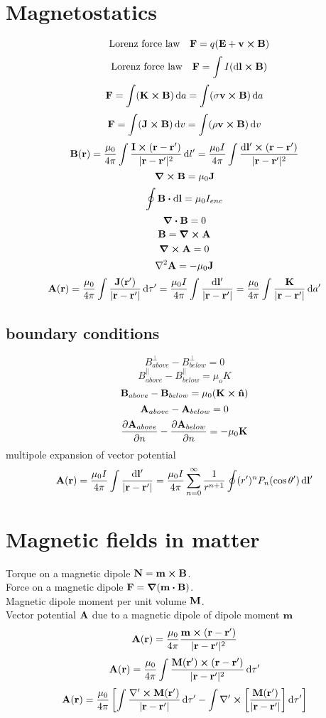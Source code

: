 \documentclass[12pt]{article}
\begin{document}
\section{Magnetostatics}
\[\qq{Lorenz force law}\vb{F}=q(\vb{E}+\vb{v}\cp\vb{B})\]
\[\qq{Lorenz force law}\vb{F}=\int I(\dd\vb{l}\cp\vb{B})\]
\[\vb{F}=\int (\vb{K}\cp\vb{B})\dd{a}=\int (\sigma\vb{v}\cp\vb{B})\dd{a}\]
\[\vb{F}=\int (\vb{J}\cp\vb{B})\dd{v}=\int (\rho\vb{v}\cp\vb{B})\dd{v}\]
\[\vb{B}(\vb{r})=\frac{\mu_0}{4\pi}\int\frac{\vb{I}\cp(\vb{r}-\vb{r}')}{|\vb{r}-\vb{r}'|^2}\dd{l'}=\frac{\mu_0I}{4\pi}\int\frac{\dd\vb{l'}\cp(\vb{r}-\vb{r}')}{|\vb{r}-\vb{r}'|^2}\]
\[\curl{\vb{B}}=\mu_0\vb{J}\]
\[\oint\vb{B}\vdot\dd{\vb{l}}=\mu_0I_{enc}\]
\[\div{\vb{B}}=0\]
\[\vb{B}=\curl{\vb{A}}\]
\[\curl{\vb{A}}=0\]
\[\laplacian{\vb{A}}=-\mu_0\vb{J}\]
\[\vb{A(\vb{r})}=\frac{\mu_0}{4\pi}\int\frac{\vb{J(\vb{r'})}}{|\vb{r}-\vb{r'}|}\dd{\tau'}=\frac{\mu_0I}{4\pi}\int\frac{\dd{\vb{l}'}}{|\vb{r}-\vb{r'}|}=\frac{\mu_0}{4\pi}\int\frac{\vb{K}}{|\vb{r}-\vb{r'}|}\dd{a'}\]
\subsection*{boundary conditions}
\[B^{\perp}_{above}-B^{\perp}_{below}=0\]
\[B^{\parallel}_{above}-B^{\parallel}_{below}=\mu_oK\]
\[\vb{B}_{above}-\vb{B}_{below}=\mu_0(\vb{K}\cp\vu{n})\]
\[\vb{A}_{above}-\vb{A}_{below}=0\]
\[\pdv{\vb{A}_{above}}{n}-\pdv{\vb{A}_{below}}{n}=-\mu_0\vb{K}\]
multipole expansion of vector potential\[\vb{A(\vb{r})}=\frac{\mu_0I}{4\pi}\int\frac{\dd{\vb{l}'}}{|\vb{r}-\vb{r'}|}=\frac{\mu_0I}{4\pi}\sum_{n=0}^{\infty}\frac{1}{r^{n+1}}\oint(r')^nP_n(\cos\theta')\dd{\vb{l'}}\]

\section{Magnetic fields in matter}
Torque on a magnetic dipole $\vb{N}=\vb{m}\cp\vb{B}$.\\
Force on a magnetic dipole $\vb{F}=\grad(\vb{m}\vdot\vb{B})$.\\
Magnetic dipole moment per unit volume $\vb{M}$.\\
Vector potential $\vb{A}$ due to a magnetic dipole of dipole moment $\vb{m}$ \[\vb{A}(\vb{r})=\frac{\mu_0}{4\pi}\frac{\vb{m}\cp(\vb{r}-\vb{r}')}{|\vb{r}-\vb{r}'|^2}\]
\[\vb{A}(\vb{r})=\frac{\mu_0}{4\pi}\int\frac{\vb{M}(\vb{r'})\cp(\vb{r}-\vb{r}')}{|\vb{r}-\vb{r}'|^2}\dd{\tau'}\]
\[\vb{A}(\vb{r})=\frac{\mu_0}{4\pi}\left[\int\frac{\mathbf{\nabla'}\cp{\vb{M}(\vb{r'})}}{|\vb{r}-\vb{r}'|}\dd{\tau'}-\int\mathbf{\nabla'}\cp\left[{\frac{\vb{M}(\vb{r'})}{|\vb{r}-\vb{r}'|}}\right]\dd{\tau'}\right]\]
\end{document}
